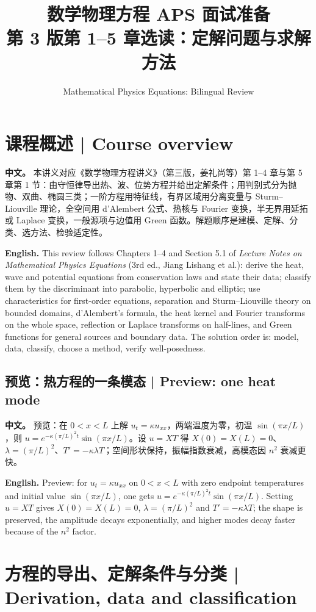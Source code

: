 \documentclass[UTF8,11pt,a4paper]{ctexart}
\title{数学物理方程 APS 面试准备\\[4pt]\large 第 3 版第 1--5 章选读：定解问题与求解方法}
\author{Mathematical Physics Equations: Bilingual Review}
\date{}
\newcommand{\APS}[2]{\par\noindent\textbf{中文。} #1\par\noindent\textbf{English.} #2\par\smallskip}
\begin{document}
\maketitle
\section*{课程概述 | Course overview}
\APS{本讲义对应《数学物理方程讲义》（第三版，姜礼尚等）第 1--4 章与第 5 章第 1 节：由守恒律导出热、波、位势方程并给出定解条件；用判别式分为抛物、双曲、椭圆三类；一阶方程用特征线，有界区域用分离变量与 Sturm--Liouville 理论，全空间用 d'Alembert 公式、热核与 Fourier 变换，半无界用延拓或 Laplace 变换，一般源项与边值用 Green 函数。解题顺序是建模、定解、分类、选方法、检验适定性。}{This review follows Chapters 1--4 and Section 5.1 of \emph{Lecture Notes on Mathematical Physics Equations} (3rd ed., Jiang Lishang et al.): derive the heat, wave and potential equations from conservation laws and state their data; classify them by the discriminant into parabolic, hyperbolic and elliptic; use characteristics for first-order equations, separation and Sturm--Liouville theory on bounded domains, d'Alembert's formula, the heat kernel and Fourier transforms on the whole space, reflection or Laplace transforms on half-lines, and Green functions for general sources and boundary data. The solution order is: model, data, classify, choose a method, verify well-posedness.}
\subsection*{预览：热方程的一条模态 | Preview: one heat mode}
\APS{预览：在 $0<x<L$ 上解 $u_t=\kappa u_{xx}$，两端温度为零，初温 $\sin(\pi x/L)$，则 $u=e^{-\kappa(\pi/L)^2t}\sin(\pi x/L)$。设 $u=XT$ 得 $X(0)=X(L)=0$、$\lambda=(\pi/L)^2$、$T'=-\kappa\lambda T$；空间形状保持，振幅指数衰减，高模态因 $n^2$ 衰减更快。}{Preview: for $u_t=\kappa u_{xx}$ on $0<x<L$ with zero endpoint temperatures and initial value $\sin(\pi x/L)$, one gets $u=e^{-\kappa(\pi/L)^2t}\sin(\pi x/L)$. Setting $u=XT$ gives $X(0)=X(L)=0$, $\lambda=(\pi/L)^2$ and $T'=-\kappa\lambda T$; the shape is preserved, the amplitude decays exponentially, and higher modes decay faster because of the $n^2$ factor.}

\section[方程导出与分类]{方程的导出、定解条件与分类 | Derivation, data and classification}
\end{document}
